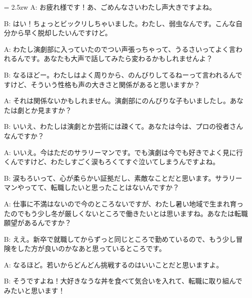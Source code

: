 \documentclass[11pt]{amsart}
\title{}
\author{}
\newenvironment{hangall}[1]{\hangindent = 2.5zw\everypar{\hangindent = 2.5zw}}{}
\begin{document}
\maketitle
\begin{hangall}{}%
A: お疲れ様です！あ、ごめんなさいわたし声大きですよね。

B: はい！ちょっとビックリしちゃいました。わたし、弱虫なんです。こんな自分から早く脱却したいんですけど。

A: わたし演劇部に入っていたのでつい声張っちゃって、うるさいってよく言われるんです。あなたも大声で話してみたら変わるかもしれませんよ？

B: なるほどー。わたしはよく周りから、のんびりしてるねーって言われるんですけど、そういう性格も声の大きさと関係があると思いますか？

A: それは関係ないかもしれません。演劇部にのんびりな子もいましたし。あなたは劇とか見ますか？

B: いいえ、わたしは演劇とか芸術には疎くて。あなたは今は、プロの役者さんなんですか？

A: いいえ。今はただのサラリーマンです。でも演劇は今でも好きでよく見に行くんですけど、わたしすごく涙もろくてすぐ泣いてしまうんですよね。

B: 涙もろいって、心が柔らかい証拠だし、素敵なことだと思います。サラリーマンやってて、転職したいと思ったことはないんですか？

A: 仕事に不満はないので今のところないですが、わたし暑い地域で生まれ育ったのでもう少し冬が厳しくないところで働きたいとは思いますね。あなたは転職願望があるんですか？

B: ええ。新卒で就職してからずっと同じところで勤めているので、もう少し冒険をした方が良いのかなあと思っているところです。

A: なるほど。若いからどんどん挑戦するのはいいことだと思いますよ。

B: そうですよね！大好きなうな丼を食べて気合いを入れて、転職に取り組んでみたいと思います！
\end{hangall}
\end{document}
